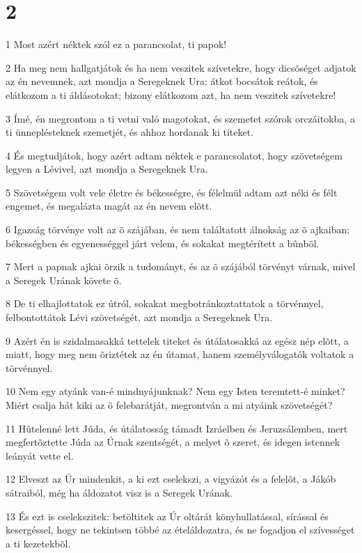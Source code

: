 \chapter{2}

\par 1 Most azért néktek szól ez a parancsolat, ti papok!
\par 2 Ha meg nem hallgatjátok és ha nem veszitek szívetekre, hogy dicsõséget adjatok az én nevemnek, azt mondja a Seregeknek Ura: átkot bocsátok reátok, és elátkozom a ti áldásotokat; bizony elátkozom azt, ha nem veszitek szívetekre!
\par 3 Ímé, én megrontom a ti vetni való magotokat, és szemetet szórok orczáitokba, a ti ünneplésteknek szemetjét, és ahhoz hordanak ki titeket.
\par 4 És megtudjátok, hogy azért adtam néktek e parancsolatot, hogy szövetségem legyen a Lévivel, azt mondja a Seregeknek Ura.
\par 5 Szövetségem volt vele életre és békességre, és félelmül adtam azt néki és félt engemet, és megalázta magát az én nevem elõtt.
\par 6 Igazság törvénye volt az õ szájában, és nem találtatott álnokság az õ ajkaiban; békességben és egyenességgel járt velem, és sokakat megtérített a bûnbõl.
\par 7 Mert a papnak ajkai õrzik a tudományt, és az õ szájából törvényt várnak, mivel a Seregek Urának  követe õ.
\par 8 De ti elhajlottatok ez útról, sokakat megbotránkoztattatok a törvénnyel, felbontottátok Lévi szövetségét, azt mondja a Seregeknek Ura.
\par 9 Azért én is szidalmasakká tettelek titeket és útálatosakká az egész nép elõtt, a miatt, hogy meg nem õriztétek az én útamat, hanem személyválogatók voltatok a törvénnyel.
\par 10 Nem egy atyánk van-é mindnyájunknak? Nem egy Isten teremtett-é minket? Miért csalja hát kiki az õ felebarátját, megrontván a mi atyáink szövetségét?
\par 11 Hûtelenné lett Júda, és útálatosság támadt Izráelben és Jeruzsálemben, mert megfertõztette Júda az Úrnak szentségét, a melyet õ szeret, és idegen istennek leányát vette el.
\par 12 Elveszt az Úr mindenkit, a ki ezt cselekszi, a vigyázót és a felelõt, a Jákób sátraiból, még ha áldozatot visz is a Seregek Urának.
\par 13 És ezt is cselekszitek: betöltitek az Úr oltárát könyhullatással, sírással és kesergéssel, hogy ne tekintsen többé az ételáldozatra, és ne fogadjon el szívességet a ti kezetekbõl.
